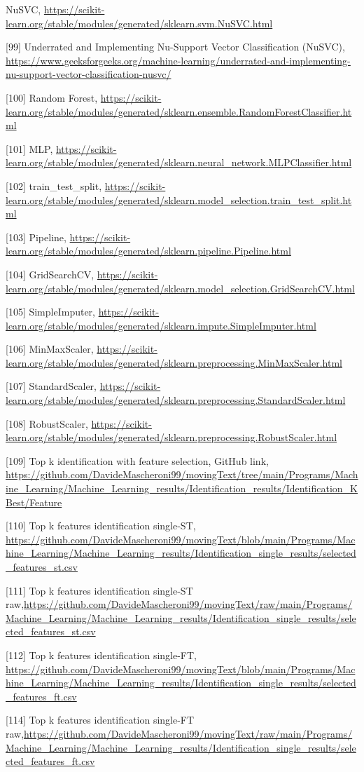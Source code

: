 \documentclass{article}
\begin{document}
\begin{raggedright}
[98] NuSVC, \url{https://scikit-learn.org/stable/modules/generated/sklearn.svm.NuSVC.html}

[99] Underrated and Implementing Nu-Support Vector Classification (NuSVC), \url{https://www.geeksforgeeks.org/machine-learning/underrated-and-implementing-nu-support-vector-classification-nusvc/}

[100] Random Forest, \url{https://scikit-learn.org/stable/modules/generated/sklearn.ensemble.RandomForestClassifier.html}

[101] MLP, \url{https://scikit-learn.org/stable/modules/generated/sklearn.neural_network.MLPClassifier.html}

[102] train\_test\_split, \url{https://scikit-learn.org/stable/modules/generated/sklearn.model_selection.train_test_split.html}

[103] Pipeline, \url{https://scikit-learn.org/stable/modules/generated/sklearn.pipeline.Pipeline.html}

[104] GridSearchCV, \url{https://scikit-learn.org/stable/modules/generated/sklearn.model_selection.GridSearchCV.html}

[105] SimpleImputer, \url{https://scikit-learn.org/stable/modules/generated/sklearn.impute.SimpleImputer.html}

[106] MinMaxScaler, \url{https://scikit-learn.org/stable/modules/generated/sklearn.preprocessing.MinMaxScaler.html}

[107] StandardScaler, \url{https://scikit-learn.org/stable/modules/generated/sklearn.preprocessing.StandardScaler.html}

[108] RobustScaler, \url{https://scikit-learn.org/stable/modules/generated/sklearn.preprocessing.RobustScaler.html}

[109] Top k identification with feature selection, GitHub link, \url{https://github.com/DavideMascheroni99/movingText/tree/main/Programs/Machine_Learning/Machine_Learning_results/Identification_results/Identification_KBest/Feature}

[110] Top k features identification single-ST, \url{https://github.com/DavideMascheroni99/movingText/blob/main/Programs/Machine_Learning/Machine_Learning_results/Identification_single_results/selected_features_st.csv}

[111] Top k features identification single-ST raw,\url{https://github.com/DavideMascheroni99/movingText/raw/main/Programs/Machine_Learning/Machine_Learning_results/Identification_single_results/selected_features_st.csv}

[112] Top k features identification single-FT, \url{https://github.com/DavideMascheroni99/movingText/blob/main/Programs/Machine_Learning/Machine_Learning_results/Identification_single_results/selected_features_ft.csv}

[114] Top k features identification single-FT raw,\url{https://github.com/DavideMascheroni99/movingText/raw/main/Programs/Machine_Learning/Machine_Learning_results/Identification_single_results/selected_features_ft.csv}

\end{raggedright}
\end{document}
